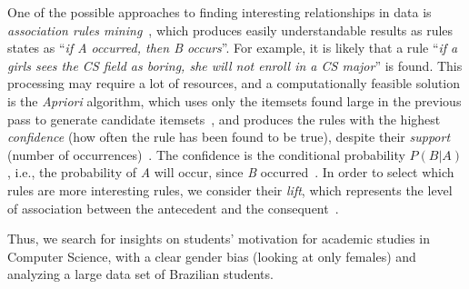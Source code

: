 One of the possible approaches to finding interesting relationships in data is \emph{association rules mining}~\cite{Cios2007}, which produces easily understandable results as rules states as ``\emph{if A occurred, then B occurs}''. For example, it is likely that a rule ``\emph{if a girls sees the CS field as boring, she will not enroll in a CS major}'' is found. This processing may require a lot of resources, and a computationally feasible solution is the \emph{Apriori} algorithm, which uses only the itemsets found large in the previous pass to generate candidate itemsets~\cite{Agrawal1994}, and produces the rules with the highest \emph{confidence} (how often the rule has been found to be true), despite their \emph{support} (number of occurrences)~\cite{taniar_exception_2008}. The confidence is the conditional probability $P(B|A)$, i.e., the probability of \emph{A} will occur, since \emph{B} occurred~\cite{Hastie2009}. In order to select  which rules are more interesting rules, we consider their \emph{lift}, which represents the level of association between the antecedent and the consequent~\cite{tan2006introduction}.

Thus, we search for insights on students' motivation for academic studies in Computer Science, with a clear gender bias (looking at only females) and analyzing a large data set of Brazilian students.
